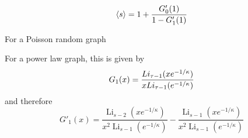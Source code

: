 \begin{equation}
\left< s \right> = 1 + \frac{G'_0(1)}{1-G'_1(1)}	
\end{equation}




For a Poisson random graph







For a power law graph, this is given by
\begin{equation}
	G_1(x) = \frac{Li_{\tau-1} ({xe^{-1/\kappa}})}{xLi_{\tau-1} ({e^{-1/\kappa}})}
\end{equation}
and therefore
\begin{equation}
	G'_1(x) = \frac{\operatorname{Li}_{s - 2} \left(x e^{- 1/\kappa}\right)}
	               {x^{2} \operatorname{Li}_{s - 1}\left(e^{- 1/\kappa}\right)} -
	          \frac{\operatorname{Li}_{s - 1}\left(x e^{- 1/\kappa}\right)}
	               {x^{2} \operatorname{Li}_{s - 1}\left(e^{- 1/\kappa}\right)}
\end{equation}

